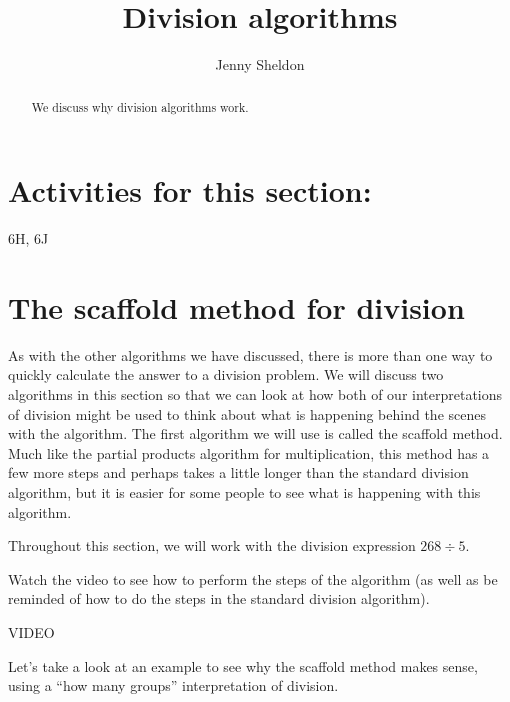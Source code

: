 \documentclass{ximera}
\title{Division algorithms}
\author{Jenny Sheldon}
\begin{document}
\begin{abstract}
We discuss why division algorithms work.
\end{abstract}
\maketitle

\section{Activities for this section:} 6H, 6J

\section{The scaffold method for division}

As with the other algorithms we have discussed, there is more than one way to quickly calculate the answer to a division problem. We will discuss two algorithms in this section so that we can look at how both of our interpretations of division might be used to think about what is happening behind the scenes with the algorithm. The first algorithm we will use is called the scaffold method. Much like the partial products algorithm for multiplication, this method has a few more steps and perhaps takes a little longer than the standard division algorithm, but it is easier for some people to see what is happening with this algorithm.

Throughout this section, we will work with the division expression $268 \div 5$.

Watch the video to see how to perform the steps of the algorithm (as well as be reminded of how to do the steps in the standard division algorithm).

VIDEO

Let's take a look at an example to see why the scaffold method makes sense, using a ``how many groups'' interpretation of division.
\end{document}
